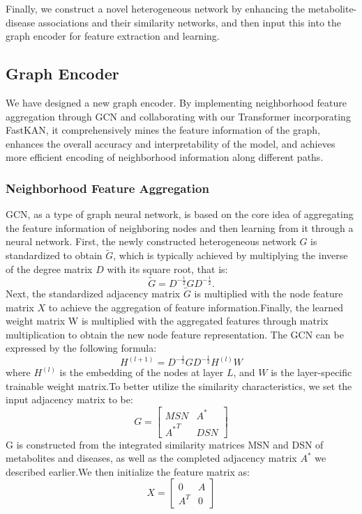 \documentclass[lettersize,journal]{IEEEtran}
\begin{document}
Finally, we construct a novel heterogeneous network by enhancing the metabolite-disease associations and their similarity networks, and then input this into the graph encoder for feature extraction and learning.

\subsection{\textbf{Graph Encoder}}
We have designed a new graph encoder. By implementing neighborhood feature aggregation through GCN and collaborating with our Transformer incorporating FastKAN, it comprehensively mines the feature information of the graph, enhances the overall accuracy and interpretability of the model, and achieves more efficient encoding of neighborhood information along different paths.

\subsubsection{\textbf{Neighborhood Feature Aggregation}}
GCN\cite{kipf2017semisupervisedclassificationgraphconvolutional}, as a type of graph neural network, is based on the core idea of aggregating the feature information of neighboring nodes and then learning from it through a neural network. First, the newly constructed heterogeneous network \(G\) is standardized to obtain \( \tilde{G} \), which is typically achieved by multiplying the inverse of the degree matrix \( D \) with its square root, that is:
\begin{equation}
	\tilde{G} = D^{-\frac{1}{2}} G D^{-\frac{1}{2}}.
\end{equation}
Next, the standardized adjacency matrix \( \tilde{G} \) is multiplied with the node feature matrix \( X \) to achieve the aggregation of feature information.Finally, the learned weight matrix W is multiplied with the aggregated features through matrix multiplication to obtain the new node feature representation. The GCN can be expressed by the following formula:
\begin{equation}
	H^{(l+1)} = D^{-\frac{1}{2}} G D^{-\frac{1}{2}} H^{(l)} W
\end{equation}
where \( H^{(l)} \) is the embedding of the nodes at layer \( L \), and \( W \) is the layer-specific trainable weight matrix.To better utilize the similarity characteristics, we set the input adjacency matrix to be:
\begin{equation}
	G = \begin{bmatrix} MSN & A^* \\ {A^*}^T & DSN \end{bmatrix}	
\end{equation}
G is constructed from the integrated similarity matrices MSN and DSN of metabolites and diseases, as well as the completed adjacency matrix \( A^* \) we described earlier.We then initialize the feature matrix as:
\begin{equation}
	X = \begin{bmatrix} 0 & A \\ A^T & 0 \end{bmatrix}	
\end{equation}
\end{document}
